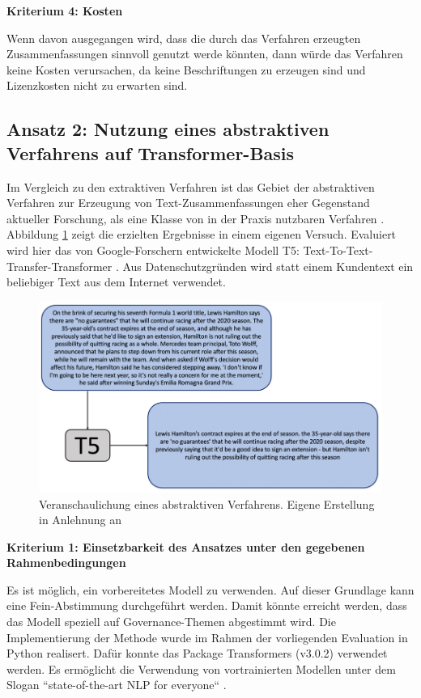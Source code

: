 {\bf Kriterium 4: Kosten}

Wenn davon ausgegangen wird, dass die durch das Verfahren erzeugten Zusammenfassungen sinnvoll genutzt werde könnten, dann würde das Verfahren keine Kosten verursachen, da keine Beschriftungen zu erzeugen sind und Lizenzkosten nicht zu erwarten sind.

\subsection{Ansatz 2: Nutzung eines abstraktiven Verfahrens auf Transformer-Basis}

Im Vergleich zu den extraktiven Verfahren ist das Gebiet der abstraktiven Verfahren zur Erzeugung von Text-Zusammenfassungen eher Gegenstand aktueller Forschung, als eine Klasse von in der Praxis nutzbaren Verfahren \cite[S. 261]{Gupta}. Abbildung \ref{Abbildung:t5} zeigt die erzielten Ergebnisse in einem eigenen Versuch. Evaluiert wird hier das von Google-Forschern entwickelte Modell T5: Text-To-Text-Transfer-Transformer \cite{Raffel}. Aus Datenschutzgründen wird statt einem Kundentext ein beliebiger Text aus dem Internet verwendet.

\begin{figure}[h]
\centering
\includegraphics[scale=0.95]{content/pics/Picture_22.png}
\caption{Veranschaulichung eines abstraktiven Verfahrens. Eigene Erstellung in Anlehnung an \cite{Raffel}}
\label{Abbildung:t5}
\end{figure}

{\bf Kriterium 1: Einsetzbarkeit des Ansatzes unter den gegebenen Rahmenbedingungen}

Es ist möglich, ein vorbereitetes Modell  zu verwenden. Auf dieser Grundlage kann eine Fein-Abstimmung durchgeführt werden. Damit könnte erreicht werden, dass das Modell speziell auf Governance-Themen abgestimmt wird. Die Implementierung der Methode wurde im Rahmen der vorliegenden Evaluation in Python realisert. Dafür konnte das Package Transformers (v3.0.2) verwendet werden. Es ermöglicht die Verwendung von vortrainierten Modellen unter dem Slogan ``state-of-the-art NLP for everyone`` \cite{Transformers}.

